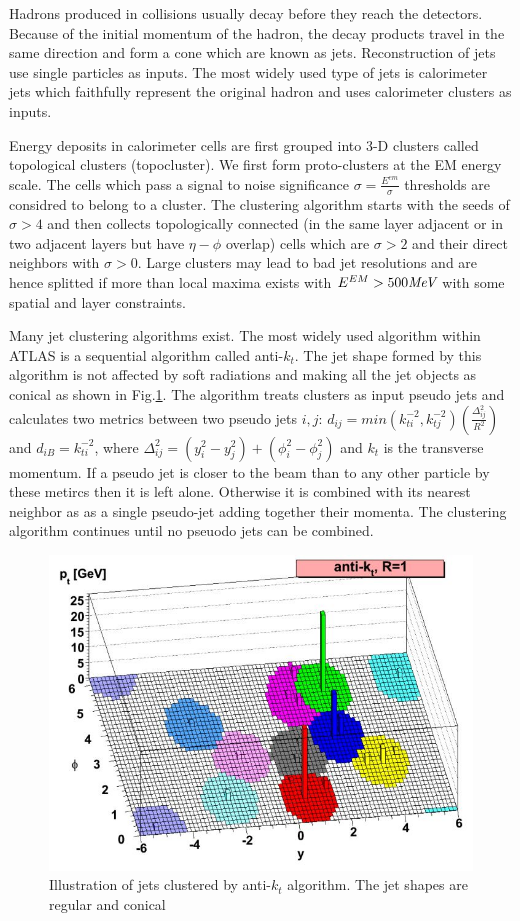 \label{sec:reco-jets}
Hadrons produced in collisions usually decay before they reach the detectors. Because of the initial momentum of the hadron, the decay products travel in the same direction and form a cone which are known as jets. Reconstruction of jets use single particles as inputs. The most widely used type of jets is calorimeter jets which faithfully represent the original hadron and uses calorimeter clusters as inputs. 

Energy deposits in calorimeter cells are first grouped into 3-D clusters called topological clusters (topocluster)\cite{PERF-2014-07}. We first form proto-clusters at the EM energy scale. The cells which pass a signal to noise significance $\sigma=\frac{E^{em}}{\sigma}$ thresholds are considred to belong to a cluster. The clustering algorithm starts with the seeds of $\sigma>4$ and then collects topologically connected (in the same layer adjacent or in two adjacent layers but have $\eta- \phi$ overlap) cells which are $\sigma>2$ and their direct neighbors with $\sigma>0$. Large clusters may lead to bad jet resolutions and are hence splitted if more than local maxima exists with $E^{EM}>500 \textit{MeV}$ with some spatial and layer constraints.

Many jet clustering algorithms exist. The most widely used algorithm within ATLAS is a sequential algorithm called anti-$k_t$\cite{Cacciari:2008gp}. The jet shape formed by this algorithm is not affected by soft radiations and making all the jet objects as conical as shown in Fig.\ref{fig:reco-antikt}. The algorithm treats clusters as input pseudo jets and calculates two metrics between two pseudo jets $i,j$: $d_{ij}=min(k^{-2}_{ti},k^{-2}_{tj})(\frac{\Delta^2_{ij}}{R^2})$ and $d_{iB}=k^{-2}_{ti}$, where $\Delta^2_{ij}=(y_i^2-y_j^2)+(\phi_i^2-\phi_j^2)$ and $k_t$ is the transverse momentum. If a pseudo jet is closer to the beam than to any other particle by these metircs then it is left alone. Otherwise it is combined with its nearest neighbor as as a single pseudo-jet adding together their momenta. The clustering algorithm continues until no pseuodo jets can be combined.

\begin{figure}[htpb!]
\begin{center}
  \includegraphics[width=0.55\linewidth]{figures/Reco/Antikt}
\caption{Illustration of jets clustered by anti-$k_t$ algorithm. The jet shapes are regular and conical}
\label{fig:reco-antikt}
\end{center}
\end{figure}

